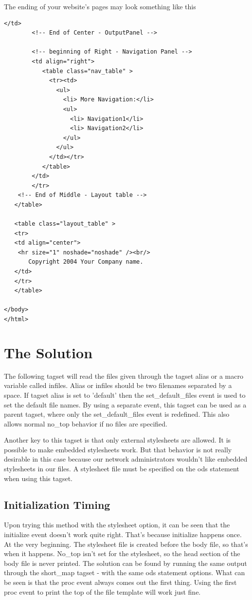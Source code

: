 The ending of your website's pages may look something like this

\begin{Verbatim}[frame=lines, framesep=3mm, label={Sample2}]
        </td>
        <!-- End of Center - OutputPanel -->

        <!-- beginning of Right - Navigation Panel -->
        <td align="right">
           <table class="nav_table" >
             <tr><td>
               <ul>
                 <li> More Navigation:</li>
                 <ul>
                   <li> Navigation1</li>
                   <li> Navigation2</li>
                 </ul>
               </ul>
             </td></tr>
           </table>
        </td>
        </tr>
    <!-- End of Middle - Layout table -->
   </table>

   <table class="layout_table" >
   <tr>
   <td align="center">
    <hr size="1" noshade="noshade" /><br/>
       Copyright 2004 Your Company name. 
   </td>
   </tr>
   </table>

</body>
</html>
\end{Verbatim}

\section{The Solution}
The following tagset will read the files given through the tagset alias or 
a macro variable called infiles.  Alias or infiles should be two
filenames separated by a space.   
If tagset alias is set to 'default' then the 
set\_default\_files event is used to set the default file names.
By using a separate event, this tagset can be used as a parent
tagset, where only the set\_default\_files event is redefined.
This also allows normal no\_top behavior if no files are specified.  

Another key to this tagset is that only external stylesheets are
allowed.  It is possible to make embedded stylesheets work.  But
that behavior is not really desirable in this case because our network
administrators wouldn't like embedded stylesheets in our files.  
A stylesheet file must be specified on the ods statement when using
this tagset.

\subsection{Initialization Timing}
Upon trying this method with the stylesheet option, it can be seen that the initialize event
doesn't work quite right.  That's because initialize happens once.  At the very beginning.
The stylesheet file is created before the body file, so that's when it happens.  No\_top isn't
set for the stylesheet, so the head section of the body file is never printed.  
The solution can be found
by running the same output through the short\_map tagset - with the same ods statement options.
What can be seen is that the proc event always comes out the first thing.  Using the first
proc event to print the top of the file template will work just fine.
 
